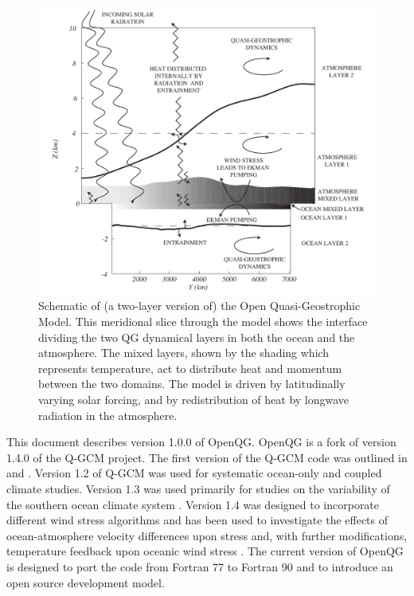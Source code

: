 \documentclass[11pt, a4paper,twoside]{article}
\numberwithin{equation}{section}
\begin{document}
\begin{figure}[!t]
\includegraphics[width=\hsize]{sketch}
\caption{\small Schematic of (a two-layer version of) the Open Quasi-Geostrophic Model. This
meridional slice through the model shows the interface dividing the two QG
dynamical layers in both the ocean and the atmosphere. The mixed layers,
shown by the shading which represents temperature, act to distribute heat
and momentum between the two domains. The model is driven by latitudinally
varying solar forcing, and by redistribution of heat by longwave radiation
in the atmosphere.\label{fig:sketch}}
\end{figure}

This document describes version 1.0.0 of OpenQG.
OpenQG is a fork of version 1.4.0 of the Q-GCM project.
The first version of the Q-GCM code was outlined in \citet{hogg:03b} and \citet{hogg:03c}.
Version 1.2 of Q-GCM was used for systematic ocean-only \citep{hogg:05a} and coupled climate \citep{hogg:06a,hogg:07} studies.
Version 1.3 was used primarily for studies on the variability of the southern ocean climate system \citep{hogg:06c,meredith:06,hogg:08b}.
Version 1.4 was designed to incorporate different wind stress algorithms and has been used to investigate the effects of ocean-atmosphere velocity differences upon stress \citep{hutchinson:10} and, with further modifications, temperature feedback upon oceanic wind stress \citep{hogg:09}.
The current version of OpenQG is designed to port the code from Fortran 77 to Fortran 90 and to introduce an open source development model.
\end{document}
